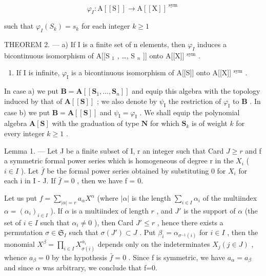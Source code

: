 \[
\varphi_ {I}: \mathrm{A} [ [ \mathrm{S} ] ] \rightarrow \mathrm{A} [ [ \mathrm{X} ] ] ^ {\text { sym }}
\]

such that \(\varphi_{I}(S_{k}) = s_{k}\) for each integer \(k\geqslant 1\)

THEOREM 2. --- a) If I is a finite set of n elements, then \(\varphi_{I}\) induces a bicontinuous isomorphism of A{[}{[}S \(_{1}\) , \ldots, S \(_{n}\) {]}{]} onto A{[}{[}X{]}{]} \(^{\text{sym}}\) .

\begin{enumerate}
\def\labelenumi{\alph{enumi})}
\setcounter{enumi}{1}
\tightlist
\item
  If I is infinite, \(\varphi_{\mathrm{I}}\) is a bicontinuous isomorphism of A{[}{[}S{]}{]} onto A{[}{[}X{]}{]} \(^{\mathrm{sym}}\) .
\end{enumerate}

In case a) we put \(\mathbf{B} = \mathbf{A}[[\mathbf{S}_1, \ldots, \mathbf{S}_n]]\) and equip this algebra with the topology induced by that of \(\mathbf{A}[[\mathbf{S}]]\) ; we also denote by \(\psi_{\mathrm{I}}\) the restriction of \(\varphi_{\mathrm{I}}\) to \(\mathbf{B}\) . In case b) we put \(\mathbf{B} = \mathbf{A}[[\mathbf{S}]]\) and \(\psi_{\mathrm{I}} = \varphi_{\mathrm{I}}\) . We shall equip the polynomial algebra \(\mathbf{A}[\mathbf{S}]\) with the graduation of type \(\mathbf{N}\) for which \(\mathbf{S}_k\) is of weight \(k\) for every integer \(k \geqslant 1\) .

Lemma 1. --- Let J be a finite subset of I, r an integer such that Card \(J \geqslant r\) and f a symmetric formal power series which is homogeneous of degree r in the \(X_{i}\) ( \(i \in I\) ). Let \(\bar{f}\) be the formal power series obtained by substituting 0 for \(X_{i}\) for each i in I - J. If \(\bar{f} = 0\) , then we have f = 0.

Let us put \(f = \sum_{|\alpha| = r} a_{\alpha} X^{\alpha}\) (where \(|\alpha|\) is the length \(\sum_{i \in I} \alpha_i\) of the multiindex \(\alpha = (\alpha_i)_{i \in I}\) ). If \(\alpha\) is a multiindex of length \(r\) , and \(J'\) is the support of \(\alpha\) (the set of \(i \in I\) such that \(\alpha_i \neq 0\) ), then Card \(J' \leqslant r\) , hence there exists a permutation \(\sigma \in \mathfrak{S}_I\) such that \(\sigma(J') \subset J\) . Put \(\beta_i = \alpha_{\sigma^{-1}(i)}\) for \(i \in I\) , then the monomial \(X^\beta = \prod_{i \in I} X_{\sigma(i)}^{\alpha_i}\) depends only on the indeterminates \(X_j (j \in J)\) , whence \(a_\beta = 0\) by the hypothesis \(\bar{f}=0\) . Since f is symmetric, we have \(a_{\alpha}=a_{\beta}\) and since \(\alpha\) was arbitrary, we conclude that f=0.

